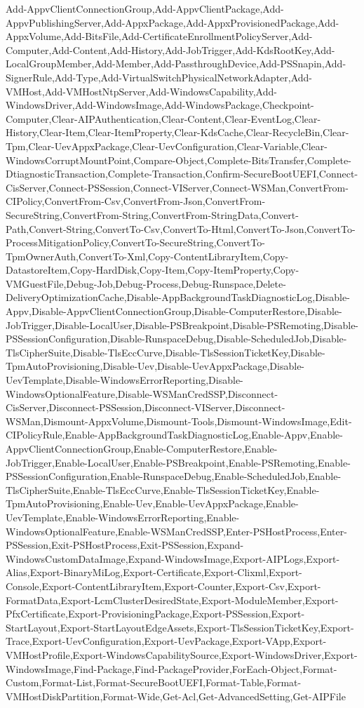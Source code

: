 {{		Add-AppvClientConnectionGroup,Add-AppvClientPackage,Add-AppvPublishingServer,Add-AppxPackage,Add-AppxProvisionedPackage,Add-AppxVolume,Add-BitsFile,Add-CertificateEnrollmentPolicyServer,Add-Computer,Add-Content,Add-History,Add-JobTrigger,Add-KdsRootKey,Add-LocalGroupMember,Add-Member,Add-PassthroughDevice,Add-PSSnapin,Add-SignerRule,Add-Type,Add-VirtualSwitchPhysicalNetworkAdapter,Add-VMHost,Add-VMHostNtpServer,Add-WindowsCapability,Add-WindowsDriver,Add-WindowsImage,Add-WindowsPackage,Checkpoint-Computer,Clear-AIPAuthentication,Clear-Content,Clear-EventLog,Clear-History,Clear-Item,Clear-ItemProperty,Clear-KdsCache,Clear-RecycleBin,Clear-Tpm,Clear-UevAppxPackage,Clear-UevConfiguration,Clear-Variable,Clear-WindowsCorruptMountPoint,Compare-Object,Complete-BitsTransfer,Complete-DtiagnosticTransaction,Complete-Transaction,Confirm-SecureBootUEFI,Connect-CisServer,Connect-PSSession,Connect-VIServer,Connect-WSMan,ConvertFrom-CIPolicy,ConvertFrom-Csv,ConvertFrom-Json,ConvertFrom-SecureString,ConvertFrom-String,ConvertFrom-StringData,Convert-Path,Convert-String,ConvertTo-Csv,ConvertTo-Html,ConvertTo-Json,ConvertTo-ProcessMitigationPolicy,ConvertTo-SecureString,ConvertTo-TpmOwnerAuth,ConvertTo-Xml,Copy-ContentLibraryItem,Copy-DatastoreItem,Copy-HardDisk,Copy-Item,Copy-ItemProperty,Copy-VMGuestFile,Debug-Job,Debug-Process,Debug-Runspace,Delete-DeliveryOptimizationCache,Disable-AppBackgroundTaskDiagnosticLog,Disable-Appv,Disable-AppvClientConnectionGroup,Disable-ComputerRestore,Disable-JobTrigger,Disable-LocalUser,Disable-PSBreakpoint,Disable-PSRemoting,Disable-PSSessionConfiguration,Disable-RunspaceDebug,Disable-ScheduledJob,Disable-TlsCipherSuite,Disable-TlsEccCurve,Disable-TlsSessionTicketKey,Disable-TpmAutoProvisioning,Disable-Uev,Disable-UevAppxPackage,Disable-UevTemplate,Disable-WindowsErrorReporting,Disable-WindowsOptionalFeature,Disable-WSManCredSSP,Disconnect-CisServer,Disconnect-PSSession,Disconnect-VIServer,Disconnect-WSMan,Dismount-AppxVolume,Dismount-Tools,Dismount-WindowsImage,Edit-CIPolicyRule,Enable-AppBackgroundTaskDiagnosticLog,Enable-Appv,Enable-AppvClientConnectionGroup,Enable-ComputerRestore,Enable-JobTrigger,Enable-LocalUser,Enable-PSBreakpoint,Enable-PSRemoting,Enable-PSSessionConfiguration,Enable-RunspaceDebug,Enable-ScheduledJob,Enable-TlsCipherSuite,Enable-TlsEccCurve,Enable-TlsSessionTicketKey,Enable-TpmAutoProvisioning,Enable-Uev,Enable-UevAppxPackage,Enable-UevTemplate,Enable-WindowsErrorReporting,Enable-WindowsOptionalFeature,Enable-WSManCredSSP,Enter-PSHostProcess,Enter-PSSession,Exit-PSHostProcess,Exit-PSSession,Expand-WindowsCustomDataImage,Expand-WindowsImage,Export-AIPLogs,Export-Alias,Export-BinaryMiLog,Export-Certificate,Export-Clixml,Export-Console,Export-ContentLibraryItem,Export-Counter,Export-Csv,Export-FormatData,Export-LcmClusterDesiredState,Export-ModuleMember,Export-PfxCertificate,Export-ProvisioningPackage,Export-PSSession,Export-StartLayout,Export-StartLayoutEdgeAssets,Export-TlsSessionTicketKey,Export-Trace,Export-UevConfiguration,Export-UevPackage,Export-VApp,Export-VMHostProfile,Export-WindowsCapabilitySource,Export-WindowsDriver,Export-WindowsImage,Find-Package,Find-PackageProvider,ForEach-Object,Format-Custom,Format-List,Format-SecureBootUEFI,Format-Table,Format-VMHostDiskPartition,Format-Wide,Get-Acl,Get-AdvancedSetting,Get-AIPFile}}
